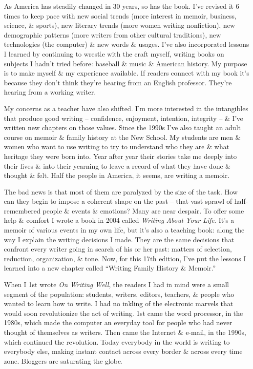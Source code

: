 \documentclass{article}
\begin{document}
As America has steadily changed in 30 years, so has the book. I've revised it 6 times to keep pace with new social trends (more interest in memoir, business, science, \& sports), new literary trends (more women writing nonfiction), new demographic patterns (more writers from other cultural traditions), new technologies (the computer) \& new words \& usages. I've also incorporated lessons I learned by continuing to wrestle with the craft myself, writing books on subjects I hadn't tried before: baseball \& music \& American history. My purpose is to make myself \& my experience available. If readers connect with my book it's because they don't think they're hearing from an English professor. They're hearing from a working writer.

My concerns as a teacher have also shifted. I'm more interested in the intangibles that produce good writing -- confidence, enjoyment, intention, integrity -- \& I've written new chapters on those values. Since the 1990s I've also taught an adult course on memoir \& family history at the New School. My students are men \& women who want to use writing to try to understand who they are \& what heritage they were born into. Year after year their stories take me deeply into their lives \& into their yearning to leave a record of what they have done \& thought \& felt. Half the people in America, it seems, are writing a memoir.

The bad news is that most of them are paralyzed by the size of the task. How can they begin to impose a coherent shape on the past -- that vast sprawl of half-remembered people \& events \& emotions? Many are near despair. To offer some help \& comfort I wrote a book in 2004 called \textit{Writing About Your Life}. It's a memoir of various events in my own life, but it's also a teaching book: along the way I explain the writing decisions I made. They are the same decisions that confront every writer going in search of his or her past: matters of selection, reduction, organization, \& tone. Now, for this 17th edition, I've put the lessons I learned into a new chapter called ``Writing Family History \& Memoir.''

When I 1st wrote \textit{On Writing Well}, the readers I had in mind were a small segment of the population: students, writers, editors, teachers, \& people who wanted to learn how to write. I had no inkling of the electronic marvels that would soon revolutionize the act of writing. 1st came the word processor, in the 1980s, which made the computer an everyday  tool for people who had never thought of themselves as writers. Then came the Internet \& e-mail, in the 1990s, which continued the revolution. Today everybody in the world is writing to everybody else, making instant contact across every border \& across every time zone. Bloggers are saturating the globe.
\end{document}
